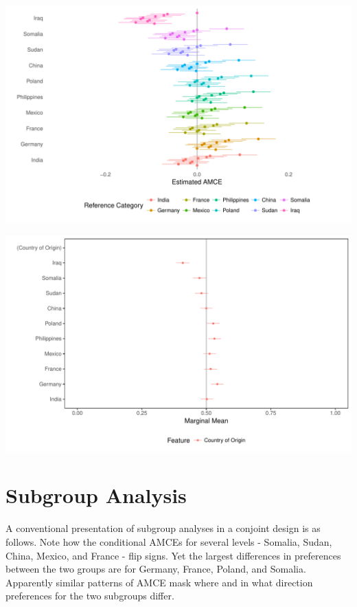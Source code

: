 \documentclass[a4paper,12pt]{article}\usepackage[]{graphicx}\usepackage[]{color}
\makeatletter
\def\maxwidth{ %
  \ifdim\Gin@nat@width>\linewidth
    \linewidth
  \else
    \Gin@nat@width
  \fi
}
\newenvironment{knitrout}{}{} %
\makeatother
\begin{document}
\begin{knitrout}
\color{fgcolor}
\includegraphics[width=\maxwidth]{figure/r_reference_category-1} 

\end{knitrout}

\begin{knitrout}
\color{fgcolor}
\includegraphics[width=\maxwidth]{figure/r_marginal_means-1} 

\end{knitrout}

\clearpage

\section{Subgroup Analysis}

A conventional presentation of subgroup analyses in a conjoint design is as follows. Note how the conditional AMCEs for several levels - Somalia, Sudan, China, Mexico, and France - flip signs. Yet the largest differences in preferences between the two groups are for Germany, France, Poland, and Somalia. Apparently similar patterns of AMCE mask where and in what direction preferences for the two subgroups differ.
\end{document}
